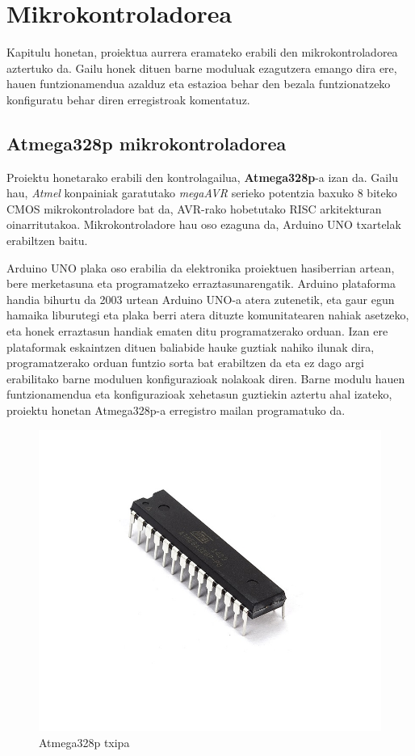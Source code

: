 \chapter{Mikrokontroladorea}

\vspace{4cm}

Kapitulu honetan, proiektua aurrera eramateko erabili den mikrokontroladorea aztertuko da. Gailu honek dituen barne moduluak ezagutzera emango dira ere, hauen funtzionamendua azalduz eta estazioa behar den bezala funtzionatzeko konfiguratu behar diren erregistroak komentatuz.

\newpage

\section{Atmega328p mikrokontroladorea}

Proiektu honetarako erabili den kontrolagailua, \textbf{Atmega328p}-a izan da. Gailu hau, \textit{Atmel} konpainiak garatutako \textit{megaAVR} serieko potentzia baxuko 8 biteko CMOS mikrokontroladore bat da, AVR-rako hobetutako RISC arkitekturan oinarritutakoa. Mikrokontroladore hau oso ezaguna da, Arduino UNO txartelak erabiltzen baitu.

Arduino UNO plaka oso erabilia da elektronika proiektuen hasiberrian artean, bere merketasuna eta programatzeko erraztasunarengatik. Arduino plataforma handia bihurtu da 2003 urtean Arduino UNO-a atera zutenetik, eta gaur egun hamaika liburutegi eta plaka berri atera dituzte komunitatearen nahiak asetzeko, eta honek erraztasun handiak ematen ditu programatzerako orduan. Izan ere plataformak eskaintzen dituen baliabide hauke guztiak nahiko ilunak dira, programatzerako orduan funtzio sorta bat erabiltzen da eta ez dago argi erabilitako barne moduluen konfigurazioak nolakoak diren. Barne modulu hauen funtzionamendua eta konfigurazioak xehetasun guztiekin aztertu ahal izateko, proiektu honetan Atmega328p-a erregistro mailan programatuko da. 

\begin{figure}[htb]
	\centering
	\includegraphics[width=.4\linewidth]{images/atmega.jpeg}
	\caption{\label{fig:bloke_diag} Atmega328p txipa}
\end{figure}

